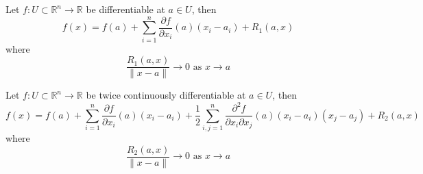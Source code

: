 \documentclass[openany]{book}
\newcommand{\R}{\mathbb{R}}
\begin{document}
\begin{defn}
    Let $f:U\subset\R^n\to\R$ be differentiable at $a\in U$, then 
    \begin{equation*}
        f(x)=f(a)+\sum_{i=1}^n\frac{\partial f}{\partial x_i}(a)(x_i-a_i)+R_1(a,x)
    \end{equation*}
    where 
    \begin{equation*}
        \frac{R_1(a,x)}{\|x-a\|}\to 0 \text{ as } x\to a
    \end{equation*}
\end{defn}

\begin{defn}\label{taylor}
    Let $f:U\subset\R^n\to\R$ be twice continuously differentiable at $a\in U$, then 
    \begin{equation*}
        f(x)=f(a)+\sum_{i=1}^n\frac{\partial f}{\partial x_i}(a)(x_i-a_i)+\frac{1}{2}\sum_{i,j=1}^n\frac{\partial^2 f}{\partial x_i\partial x_j}(a)(x_i-a_i)(x_j-a_j)+R_2(a,x)
    \end{equation*}
    where 
    \begin{equation*}
        \frac{R_2(a,x)}{\|x-a\|}\to 0 \text{ as } x\to a
    \end{equation*}
\end{defn}




\end{document}
